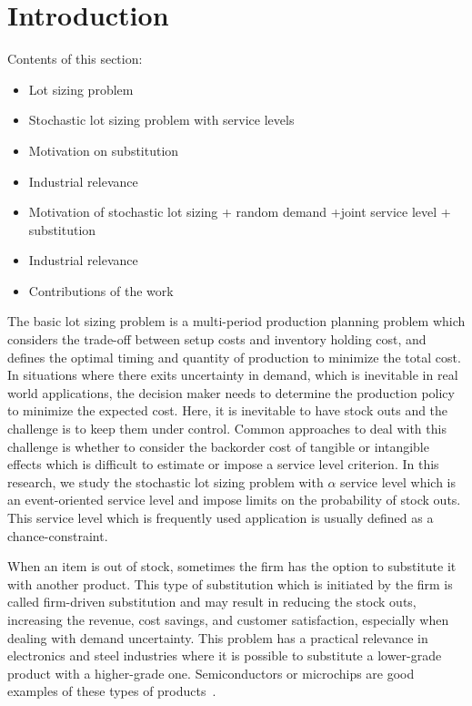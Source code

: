 \documentclass[10pt]{article}
\newcommand{\cred}{\color{red!65!black}}
\begin{document}
\section{Introduction}
{\cred
Contents of this section:

\begin{itemize}
    \item Lot sizing problem 
    \item Stochastic lot sizing problem with service levels
    \item Motivation on substitution
    \item Industrial relevance
    \item Motivation of stochastic lot sizing + random demand +joint service level + substitution 
    \item Industrial relevance
    \item Contributions of the work
\end{itemize}
}
The basic lot sizing problem is a multi-period production planning problem which considers the trade-off between setup costs and inventory holding cost, and defines the optimal timing and quantity of production to minimize the total cost. 
In situations where there exits uncertainty in demand, which is inevitable in real world applications, the decision maker needs to determine the production policy to minimize the expected cost. Here, it is inevitable to have stock outs and the challenge is to keep them under control. Common approaches to deal with this challenge is whether to consider the backorder cost of tangible or intangible effects which is difficult to estimate or impose a service level criterion. 
In this research, we study the stochastic lot sizing problem with $\alpha$ service level which is an event-oriented service level and impose limits on the probability of stock outs. This service level which is frequently used application is usually defined as a chance-constraint. 

When an item is out of stock, sometimes the firm has the option to substitute it with another product. This type of substitution which is initiated by the firm is called firm-driven substitution and may result in reducing the stock outs, increasing the revenue, cost savings, and customer satisfaction, especially when dealing with demand uncertainty. This problem has a practical relevance in electronics and steel industries where it is possible to substitute a lower-grade product with a higher-grade one. Semiconductors or microchips are good examples of these types of products~\cite{lang2010efficient}. 
\end{document}
